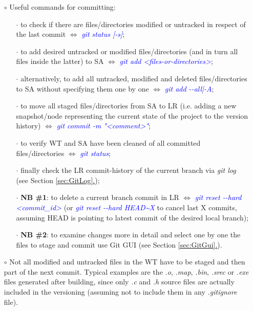 \documentclass[a4paper,portrait,10pt]{article}   %
\newcommand{\mydiv}{$\Leftrightarrow$ }   %
\newcommand{\mycmd}[1]{\textcolor{blue}{\textit{#1}}}   %
\newcommand{\myvspace}{\vspace{4mm}}   %
\newcommand{\mysecref}[1]{\hyperref[#1]{\ref{#1}.}}   %
\begin{document}
\begin{itemize}
\item[$\circ$] Useful commands for committing:
\begin{itemize}
  \item[$\cdot$] to check if there are files/directories modified or untracked in respect of the last commit \mydiv \mycmd{git status [-s]};
  \item[$\cdot$] to add desired untracked or modified files/directories (and in turn all files inside the latter) to SA \mydiv \mycmd{git add <files-or-directories>};
  \item[$\cdot$] alternatively, to add all untracked, modified and deleted files/directories to SA without specifying them one by one \mydiv \mycmd{git add -{}-all|-A};
  \item[$\cdot$] to move all staged files/directories from SA to LR (i.e. adding a new snapshot/node representing the current state of the project to the version history) \mydiv \mycmd{git commit -m "<comment>"};
  \item[$\cdot$] to verify WT and SA have been cleaned of all committed files/directories \mydiv \mycmd{git status};
  \item[$\cdot$] finally check the LR commit-history of the current branch via \textit{git log} (see Section \mysecref{sec:GitLog});
  \item[$\cdot$] \textbf{NB \#1}: to delete a current branch commit in LR \mydiv \mycmd{git reset -{}-hard <commit\_id>} (or \mycmd{git reset -{}-hard HEAD\textasciitilde X} to cancel last X commits, assuming HEAD is pointing to latest commit of the desired local branch);
  \item[$\cdot$] \textbf{NB \#2}: to examine changes more in detail and select one by one the files to stage and commit use Git GUI (see Section \mysecref{sec:GitGui}).
\end{itemize}
\myvspace

\item[$\circ$] Not all modified and untracked files in the WT have to be staged and then part of the next commit. Typical examples are the \textit{.o}, \textit{.map}, \textit{.bin}, \textit{.srec} or \textit{.exe} files generated after building, since only \textit{.c} and \textit{.h} source files are actually included in the versioning (assuming not to include them in any \textit{.gitignore} file).
\end{itemize}
\myvspace

\end{document}
